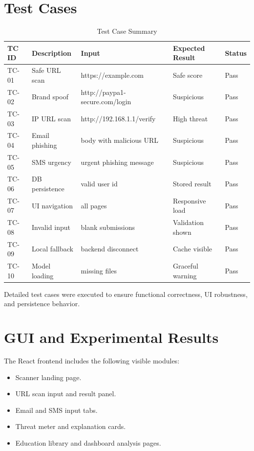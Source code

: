 \documentclass[conference]{IEEEtran}
\begin{document}
\section{Test Cases}
\begin{table}[ht]
\centering
\caption{Test Case Summary}
\label{tab:testcases}
\begin{tabular}{@{}lllll@{}}
\toprule
TC ID & Description & Input & Expected Result & Status \\
\midrule
TC-01 & Safe URL scan & https://example.com & Safe score & Pass \\
TC-02 & Brand spoof & http://paypa1-secure.com/login & Suspicious & Pass \\
TC-03 & IP URL scan & http://192.168.1.1/verify & High threat & Pass \\
TC-04 & Email phishing & body with malicious URL & Suspicious & Pass \\
TC-05 & SMS urgency & urgent phishing message & Suspicious & Pass \\
TC-06 & DB persistence & valid user id & Stored result & Pass \\
TC-07 & UI navigation & all pages & Responsive load & Pass \\
TC-08 & Invalid input & blank submissions & Validation shown & Pass \\
TC-09 & Local fallback & backend disconnect & Cache visible & Pass \\
TC-10 & Model loading & missing files & Graceful warning & Pass \\
\bottomrule
\end{tabular}
\end{table}

Detailed test cases were executed to ensure functional correctness, UI robustness, and persistence behavior.

\section{GUI and Experimental Results}
The React frontend includes the following visible modules:
\begin{itemize}[itemsep=0pt,topsep=0pt]
    \item Scanner landing page.
    \item URL scan input and result panel.
    \item Email and SMS input tabs.
    \item Threat meter and explanation cards.
    \item Education library and dashboard analysis pages.
\end{itemize}
\end{document}
